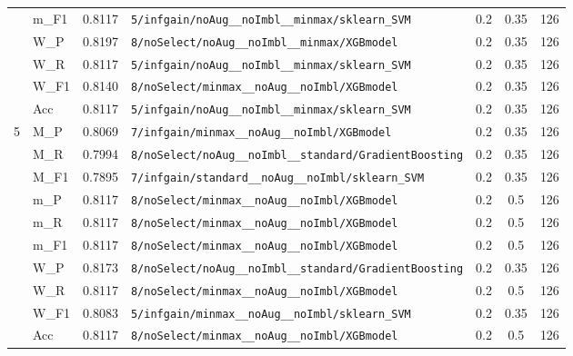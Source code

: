 \begin{table}[htbp]
\begin{tabular}{|c|l|c|>{\ttfamily\footnotesize}p{7.2cm}|c|c|c|}
 & m\_F1 & 0.8117 & \texttt{5/infgain/noAug\_\_noImbl\_\_minmax/sklearn\_SVM} & 0.2 & 0.35  & 126 \\ 
 & W\_P & 0.8197 & \texttt{8/noSelect/noAug\_\_noImbl\_\_minmax/XGBmodel} & 0.2 & 0.35  & 126 \\ 
 & W\_R & 0.8117 & \texttt{5/infgain/noAug\_\_noImbl\_\_minmax/sklearn\_SVM} & 0.2 & 0.35  & 126 \\ 
 & W\_F1 & 0.8140 & \texttt{8/noSelect/minmax\_\_noAug\_\_noImbl/XGBmodel} & 0.2 & 0.35  & 126 \\ 
 & Acc & 0.8117 & \texttt{5/infgain/noAug\_\_noImbl\_\_minmax/sklearn\_SVM} & 0.2 & 0.35  & 126 \\ 
\hline
\multirow{10}{*}{5} & M\_P & 0.8069 & \texttt{7/infgain/minmax\_\_noAug\_\_noImbl/XGBmodel} & 0.2 & 0.35  & 126 \\ 
 & M\_R & 0.7994 & \texttt{8/noSelect/noAug\_\_noImbl\_\_standard/GradientBoosting} & 0.2 & 0.35  & 126 \\ 
 & M\_F1 & 0.7895 & \texttt{7/infgain/standard\_\_noAug\_\_noImbl/sklearn\_SVM} & 0.2 & 0.35  & 126 \\ 
 & m\_P & 0.8117 & \texttt{8/noSelect/minmax\_\_noAug\_\_noImbl/XGBmodel} & 0.2 & 0.5  & 126 \\ 
 & m\_R & 0.8117 & \texttt{8/noSelect/minmax\_\_noAug\_\_noImbl/XGBmodel} & 0.2 & 0.5  & 126 \\ 
 & m\_F1 & 0.8117 & \texttt{8/noSelect/minmax\_\_noAug\_\_noImbl/XGBmodel} & 0.2 & 0.5  & 126 \\ 
 & W\_P & 0.8173 & \texttt{8/noSelect/noAug\_\_noImbl\_\_standard/GradientBoosting} & 0.2 & 0.35  & 126 \\ 
 & W\_R & 0.8117 & \texttt{8/noSelect/minmax\_\_noAug\_\_noImbl/XGBmodel} & 0.2 & 0.5  & 126 \\ 
 & W\_F1 & 0.8083 & \texttt{5/infgain/minmax\_\_noAug\_\_noImbl/sklearn\_SVM} & 0.2 & 0.35  & 126 \\ 
 & Acc & 0.8117 & \texttt{8/noSelect/minmax\_\_noAug\_\_noImbl/XGBmodel} & 0.2 & 0.5  & 126 \\ 
\hline
\end{tabular}
\end{table}